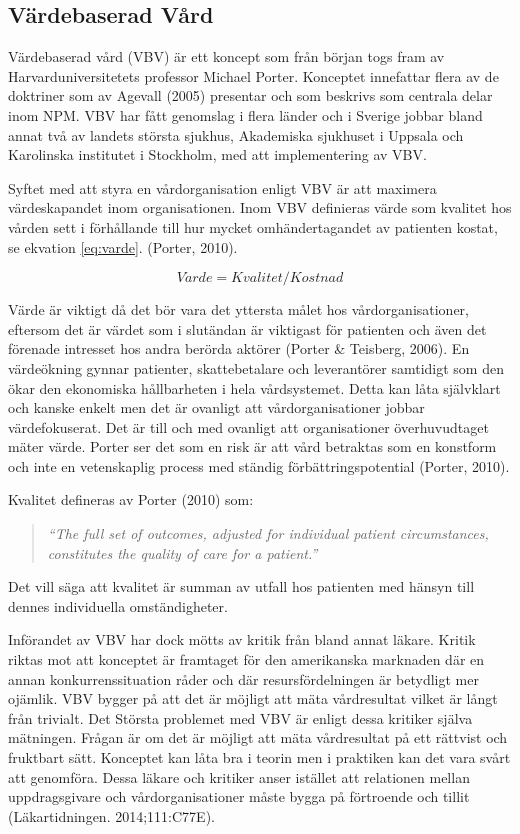 \subsection{Värdebaserad Vård}

Värdebaserad vård (VBV) är ett koncept som från början togs fram av Harvarduniversitetets professor Michael Porter. Konceptet innefattar flera av de doktriner som av Agevall (2005) presentar och som beskrivs som centrala delar inom NPM. VBV har fått genomslag i flera länder och i Sverige jobbar bland annat två av landets största sjukhus, Akademiska sjukhuset i Uppsala och Karolinska institutet i Stockholm, med att implementering av VBV.
 
Syftet med att styra en vårdorganisation enligt VBV är att maximera värdeskapandet inom organisationen. Inom VBV definieras värde som kvalitet hos vården sett i förhållande till hur mycket omhändertagandet av patienten kostat, se ekvation \ref{eq:varde}. (Porter, 2010).

\begin{equation}
\label{eq:varde}
	V \ddot{a} rde = Kvalitet/Kostnad
\end{equation}

Värde är viktigt då det bör vara det yttersta målet hos vårdorganisationer, eftersom det är värdet som i slutändan är viktigast för patienten och även det förenade intresset hos andra berörda aktörer (Porter \& Teisberg, 2006). En värdeökning gynnar patienter, skattebetalare och leverantörer samtidigt som den ökar den ekonomiska hållbarheten i hela vårdsystemet. Detta kan låta självklart och kanske enkelt men det är ovanligt att vårdorganisationer jobbar värdefokuserat. Det är till och med ovanligt att organisationer överhuvudtaget mäter värde. Porter ser det som en risk är att vård betraktas som en konstform och inte en vetenskaplig process med ständig förbättringspotential (Porter, 2010).
 
Kvalitet defineras av Porter (2010) som:
\begin{quotation}
\textit{``The full set of outcomes, adjusted for individual patient circumstances, constitutes the quality of care for a patient.''}
\end{quotation}
Det vill säga att kvalitet är summan av utfall hos patienten med hänsyn till dennes individuella omständigheter.

Införandet av VBV har dock mötts av kritik från bland annat läkare. Kritik riktas mot att konceptet är framtaget för den amerikanska marknaden där en annan konkurrenssituation råder och där resursfördelningen är betydligt mer ojämlik. VBV bygger på att det är möjligt att mäta vårdresultat vilket är långt från trivialt. Det Största problemet med VBV är enligt dessa kritiker själva mätningen. Frågan är om det är möjligt att mäta vårdresultat på ett rättvist och fruktbart sätt. Konceptet kan låta bra i teorin men i praktiken kan det vara svårt att genomföra. Dessa läkare och kritiker anser istället att relationen mellan uppdragsgivare och vårdorganisationer måste bygga på förtroende och tillit (Läkartidningen. 2014;111:C77E). 

